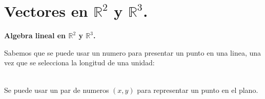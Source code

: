 \documentclass{article}
\theoremstyle{definition}
\theoremstyle{definition}
\theoremstyle{remark}
\begin{document}
\section{Vectores en $\mathbb{R}^2$ y $\mathbb{R}^3$.}
\begin{center}
\textbf{Algebra lineal en $\mathbb{R}^2$ y $\mathbb{R}^3$.}
\end{center}
Sabemos que se puede usar un numero para presentar un punto en una linea, una vez que se selecciona la longitud de una unidad:
\begin{figure}[h]
\centering
\def\svgwidth{0.5\textwidth}

\end{figure}\\
Se puede usar un par de numeros $(x,y)$ para representar un punto en el plano.
\begin{figure}[h]
\centering
\def\svgwidth{0.5\textwidth}

\end{figure} \pagebreak
\end{document}
